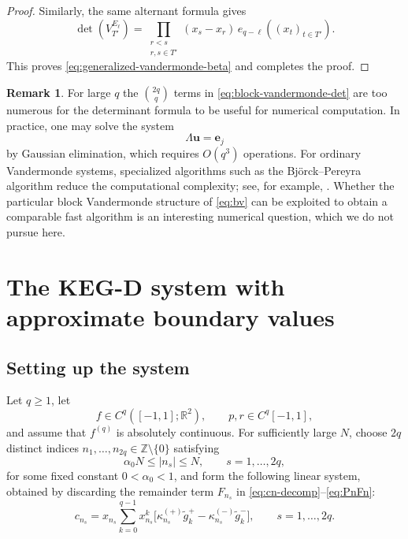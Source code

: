 \documentclass[11pt,a4paper]{article}
\theoremstyle{definition}
\newtheorem{remark}[theorem]{Remark}
\begin{document}
\begin{proof}
Similarly, the same alternant formula gives
\[
\det\!\left(V_{T'}^{E_\ell}\right)
=
\prod_{\substack{r<s\\ r,s\in T'}}(x_s-x_r)\,
e_{q-\ell}\!\left((x_t)_{t\in T'}\right).
\]
This proves \eqref{eq:generalized-vandermonde-beta} and completes the
proof.
\end{proof}
\begin{remark}
For large $q$ the $\binom{2q}{q}$ terms in
\eqref{eq:block-vandermonde-det} are too numerous for the determinant
formula to be useful for numerical computation. In practice, one may
solve the system
\[
\Lambda\mathbf{u}=\mathbf{e}_j
\]
by Gaussian elimination, which requires $O(q^3)$ operations. For
ordinary Vandermonde systems, specialized algorithms such as the
Bj\"orck--Pereyra algorithm reduce the computational complexity; see,
for example, \cite{BP}. Whether the particular block Vandermonde
structure of \eqref{eq:bv} can be exploited to obtain a comparable
fast algorithm is an interesting numerical question, which we do not
pursue here.
\end{remark}



\section{The KEG-D system with approximate boundary values}\label{sec:keg-d}

\subsection{Setting up the system}\label{ssec:setup}

Let $q\geq1$, let
\[
f\in C^q([-1,1];\mathbb R^2),
\qquad
p,r\in C^q[-1,1],
\]
and assume that $f^{(q)}$ is absolutely continuous.
For sufficiently large $N$, choose $2q$ distinct indices
$n_1,\dots,n_{2q}\in\mathbb{Z}\setminus\{0\}$ satisfying
\begin{equation}\label{eq:ns-range}
\alpha_0 N\leq |n_s|\leq N,
\qquad
s=1,\dots,2q,
\end{equation}
for some fixed constant $0<\alpha_0<1$, and form the following linear
system, obtained by discarding the remainder term $F_{n_s}$ in
\eqref{eq:cn-decomp}--\eqref{eq:PnFn}:
\begin{equation}\label{eq:keg-d-system}
c_{n_s}
=
x_{n_s}\sum_{k=0}^{q-1}x_{n_s}^{k}
\bigl[
\kappa_{n_s}^{(+)}\widetilde g_k^+
-
\kappa_{n_s}^{(-)}\widetilde g_k^-
\bigr],
\qquad
s=1,\dots,2q.
\end{equation}
\end{document}
